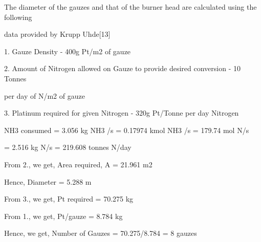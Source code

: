 \documentclass[a4paper,portrait,12pt]{article}
\begin{document}
\begin{flushleft}
The diameter of the gauzes and that of the burner head are calculated using the following
\end{flushleft}


\begin{flushleft}
data provided by Krupp Uhde[13]
\end{flushleft}


\begin{flushleft}
1. Gauze Density - 400g Pt/m2 of gauze
\end{flushleft}


\begin{flushleft}
2. Amount of Nitrogen allowed on Gauze to provide desired conversion - 10 Tonnes
\end{flushleft}


\begin{flushleft}
per day of N/m2 of gauze
\end{flushleft}


\begin{flushleft}
3. Platinum required for given Nitrogen - 320g Pt/Tonne per day Nitrogen
\end{flushleft}


\begin{flushleft}
NH3 consumed = 3.056 kg NH3 /s = 0.17974 kmol NH3 /s = 179.74 mol N/s
\end{flushleft}


\begin{flushleft}
= 2.516 kg N/s = 219.608 tonnes N/day
\end{flushleft}


\begin{flushleft}
From 2., we get, Area required, A = 21.961 m2
\end{flushleft}


\begin{flushleft}
Hence, Diameter = 5.288 m
\end{flushleft}


\begin{flushleft}
From 3., we get, Pt required = 70.275 kg
\end{flushleft}


\begin{flushleft}
From 1., we get, Pt/gauze = 8.784 kg
\end{flushleft}


\begin{flushleft}
Hence, we get, Number of Gauzes = 70.275/8.784 = 8 gauzes
\end{flushleft}
\end{document}
